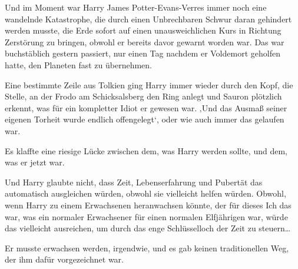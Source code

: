 Und im Moment war Harry James Potter-Evans-Verres immer noch eine wandelnde Katastrophe, die durch einen Unbrechbaren Schwur daran gehindert werden musste, die Erde sofort auf einen unausweichlichen Kurs in Richtung Zerstörung zu bringen, obwohl er bereits davor gewarnt worden war. Das war buchstäblich gestern passiert, nur einen Tag nachdem er Voldemort geholfen hatte, den Planeten fast zu übernehmen.

Eine bestimmte Zeile aus Tolkien ging Harry immer wieder durch den Kopf, die Stelle, an der Frodo am Schicksalsberg den Ring anlegt und Sauron plötzlich erkennt, was für ein kompletter Idiot er gewesen war.
‚Und das Ausmaß seiner eigenen Torheit wurde endlich offengelegt‘,
oder wie auch immer das gelaufen war.

Es klaffte eine riesige Lücke zwischen dem, was Harry werden sollte, und dem, was er jetzt war.

Und Harry glaubte nicht, dass Zeit, Lebenserfahrung und Pubertät das automatisch ausgleichen würden, obwohl sie vielleicht helfen würden. Obwohl, wenn Harry zu einem Erwachsenen heranwachsen könnte, der für dieses Ich das war, was ein normaler Erwachsener für einen normalen Elfjährigen war, würde das vielleicht ausreichen, um durch das enge Schlüsselloch der Zeit zu steuern…

Er musste erwachsen werden, irgendwie, und es gab keinen traditionellen Weg, der ihm dafür vorgezeichnet war.

